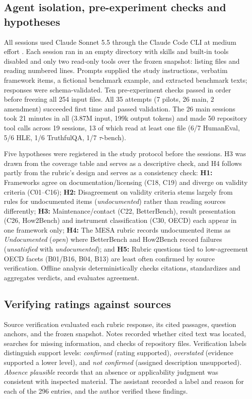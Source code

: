 \documentclass[10pt,conference]{IEEEtran}
\begin{document}
\subsection{Agent isolation, pre-experiment checks and hypotheses}
All sessions used Claude Sonnet 5.5 through the Claude Code CLI at medium effort \cite{anthropic_claude_code_cli}. Each session ran in an empty directory with skills and built-in tools disabled and only two read-only tools over the frozen snapshot: listing files and reading numbered lines. Prompts supplied the study instructions, verbatim framework items, a fictional benchmark example, and extracted benchmark texts; responses were schema-validated. Ten pre-experiment checks passed in order before freezing all 254 input files. All 35 attempts (7 pilots, 26 main, 2 amendment) succeeded first time and passed validation. The 26 main sessions took 21 minutes in all (3.87M input, 199k output tokens) and made 50 repository tool calls across 19 sessions, 13 of which read at least one file (6/7 HumanEval, 5/6 HLE, 1/6 TruthfulQA, 1/7 $\tau$-bench).

Five hypotheses were registered in the study protocol before the sessions. H3 was drawn from the coverage table and serves as a descriptive check, and H4 follows partly from the rubric's design and serves as a consistency check: \textbf{H1:} Frameworks agree on documentation/licensing (C18, C19) and diverge on validity criteria (C01--C16); \textbf{H2:} Disagreement on validity criteria stems largely from rules for undocumented items (\emph{undocumented}) rather than reading sources differently; \textbf{H3:} Maintenance/contact (C22, BetterBench), result presentation (C26, How2Bench) and instrument classification (C30, OECD) each appear in one framework only; \textbf{H4:} The MESA rubric records undocumented items as \emph{Undocumented} (\emph{open}) where BetterBench and How2Bench record failures (\emph{unsatisfied} with \emph{undocumented}); and \textbf{H5:} Rubric questions tied to low-agreement OECD facets (B01/B16, B04, B13) are least often confirmed by source verification. Offline analysis deterministically checks citations, standardizes and aggregates verdicts, and evaluates agreement.

\subsection{Verifying ratings against sources}
Source verification evaluated each rubric response, its cited passages, question anchors, and the frozen snapshot. Notes recorded whether cited text was located, searches for missing information, and checks of repository files. Verification labels distinguish support levels: \emph{confirmed} (rating supported), \emph{overstated} (evidence supported a lower level), and \emph{not confirmed} (assigned description unsupported). \emph{Absence plausible} records that an absence or applicability judgment was consistent with inspected material. The assistant recorded a label and reason for each of the 296 entries, and the author verified these findings.
\end{document}
